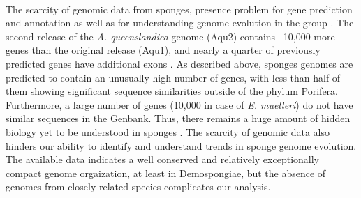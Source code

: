 \paragraph{}
The scarcity of genomic data from sponges, presence problem for gene prediction and annotation as well as for understanding genome evolution in the group \citep{hotaling2021}.
%
The second release of the \textit{A. queenslandica} genome (Aqu2) contains ~10,000 more genes than the original release (Aqu1), and nearly a quarter of previously predicted genes have additional exons \citep{fernandez-valverde2015}.
%
As described above, sponges genomes are predicted to contain an unusually high number of genes, with less than half of them showing significant sequence similarities outside of the phylum Porifera.
%
Furthermore, a large number of genes (10,000 in case of \textit{E. muelleri}) do not have similar sequences in the Genbank.
%
Thus, there remains a huge amount of hidden biology yet to be understood in sponges \citep{dunn2015}.
%
The scarcity of genomic data also hinders our ability to identify and understand trends in sponge genome evolution.
%
The available data indicates a well conserved and relatively exceptionally compact genome orgaization, at least in Demospongiae, but the absence of genomes from closely related species complicates our analysis.
\\
